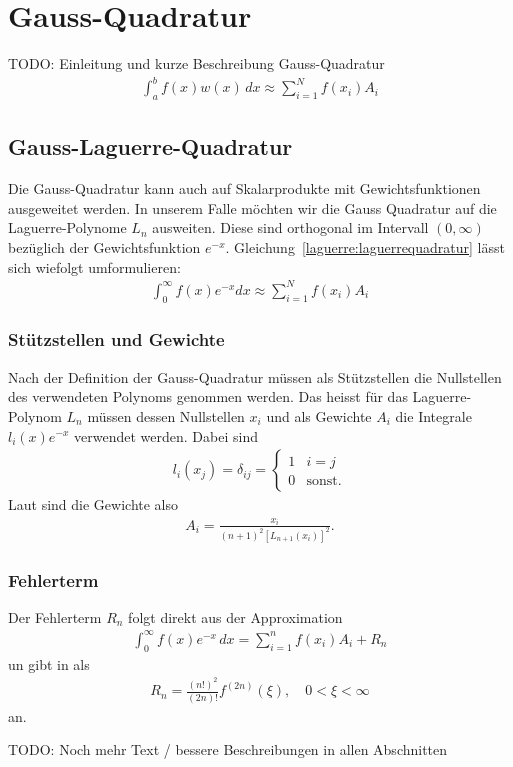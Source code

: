 %
%
%
\section{Gauss-Quadratur
  \label{laguerre:section:quadratur}}
 {\large \color{red} TODO: Einleitung und kurze Beschreibung Gauss-Quadratur}
\begin{align}
\int_a^b f(x) w(x) \, dx
\approx
\sum_{i=1}^N f(x_i) A_i
\label{laguerre:gaussquadratur}
\end{align}

\subsection{Gauss-Laguerre-Quadratur
\label{laguerre:subsection:gausslag-quadratur}}
Die Gauss-Quadratur kann auch auf Skalarprodukte mit Gewichtsfunktionen
ausgeweitet werden.
In unserem Falle möchten wir die Gauss Quadratur auf die Laguerre-Polynome
$L_n$ ausweiten.
Diese sind orthogonal im Intervall $(0, \infty)$ bezüglich
der Gewichtsfunktion $e^{-x}$.
Gleichung~\eqref{laguerre:laguerrequadratur} lässt sich wiefolgt umformulieren:
\begin{align}
\int_{0}^{\infty} f(x) e^{-x} dx
\approx
\sum_{i=1}^{N} f(x_i) A_i
\label{laguerre:laguerrequadratur}
\end{align}

\subsubsection{Stützstellen und Gewichte}
Nach der Definition der Gauss-Quadratur müssen als Stützstellen die Nullstellen
des verwendeten Polynoms genommen werden.
Das heisst für das Laguerre-Polynom $L_n$ müssen dessen Nullstellen $x_i$ und
als Gewichte $A_i$ die Integrale $l_i(x)e^{-x}$ verwendet werden.
Dabei sind
\begin{align*}
l_i(x_j)
=
\delta_{ij}
=
\begin{cases}
1 & i=j           \\
0 & \text{sonst.}
\end{cases}
\end{align*}
Laut \cite{abramowitz+stegun} sind die Gewichte also
\begin{align}
A_i
=
\frac{x_i}{(n + 1)^2 \left[ L_{n + 1}(x_i)\right]^2}
.
\label{laguerre:quadratur_gewichte}
\end{align}

\subsubsection{Fehlerterm}
Der Fehlerterm $R_n$ folgt direkt aus der Approximation
\begin{align*}
\int_0^{\infty} f(x) e^{-x} \, dx
=
\sum_{i=1}^n f(x_i) A_i + R_n
\end{align*}
un \cite{abramowitz+stegun} gibt in als
\begin{align}
R_n
=
\frac{(n!)^2}{(2n)!} f^{(2n)}(\xi)
,\quad
0 < \xi < \infty
\label{lagurre:lag_error}
\end{align}
an.

{
\large \color{red}
TODO:
Noch mehr Text / bessere Beschreibungen in allen Abschnitten
}
